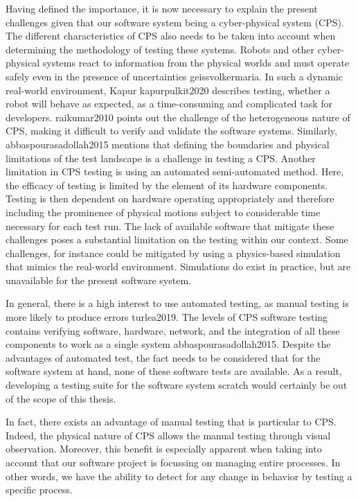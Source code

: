 Having defined the importance, it is now necessary to explain the present challenges given that our software system being a cyber-physical system (CPS). The different characteristics of CPS also needs to be taken into account when determining the methodology of testing these systems. Robots and other cyber-physical systems react to information from the physical worlds and must operate safely even in the presence of uncertainties {geissvolkermaria}. In such a dynamic real-world environment, Kapur {kapurpulkit2020} describes testing, whether a robot will behave as expected, as a time-consuming and complicated task for developers. {raikumar2010} points out the challenge of the heterogeneous nature of CPS, making it difficult to verify and validate the software systems. Similarly, {abbaspourasadollah2015} mentions that defining the boundaries and physical limitations of the test landscape is a challenge in testing a CPS. Another limitation in CPS testing is using an automated semi-automated method. Here, the efficacy of testing is limited by the element of its hardware components. Testing is then dependent on hardware operating appropriately and therefore including the prominence of physical motions subject to considerable time necessary for each test run. The lack of available software that mitigate these challenges poses a substantial limitation on the testing within our context. Some challenges, for instance could be mitigated by using a physics-based simulation that mimics the real-world environment. Simulations do exist in practice, but are unavailable for the present software system. 


In general, there is a high interest to use automated testing, as manual testing is more likely to produce errors {turlea2019}.  The levels of CPS software testing contains verifying software, hardware, network, and the integration of all these components to work as a single system {abbaspourasadollah2015}. Despite the advantages of automated test, the fact needs to be considered that for the software system at hand, none of these software tests are available. As a result, developing a testing suite for the software system scratch would certainly be out of the scope of this thesis. 

In fact, there exists an advantage of manual testing that is particular to CPS. Indeed, the physical nature of CPS allows the manual testing through visual observation. Moreover, this benefit is especially apparent when taking into account that our software project is focussing on managing entire processes. In other words, we have the ability to detect for any change in behavior by testing a specific process. 

